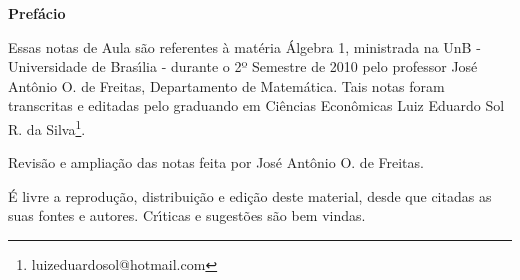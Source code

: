 \begin{center}
\Huge \textbf{Pref{\'a}cio}
\end{center}

Essas notas de Aula s{\~a}o referentes {\`a} mat{\'e}ria {\'A}lgebra 1,
ministrada na UnB - Universidade de Bras{\'\i}lia - durante o 2º Semestre de 2010
pelo professor Jos{\'e} Ant{\^o}nio O. de Freitas, Departamento de Matem{\'a}tica. Tais
notas foram transcritas e editadas pelo graduando em Ci{\^e}ncias Econ{\^o}micas
Luiz Eduardo Sol R. da Silva\footnote{luizeduardosol@hotmail.com}.

Revisão e ampliação das notas feita por José Antônio O. de Freitas.


{\'E} livre a reprodu{\c c}{\~a}o, distribui{\c c}{\~a}o e edi{\c c}{\~a}o deste material, desde que citadas as suas fontes e autores. Cr{\'\i}ticas e sugest{\~o}es s{\~a}o bem vindas.
\vspace{20cm}






